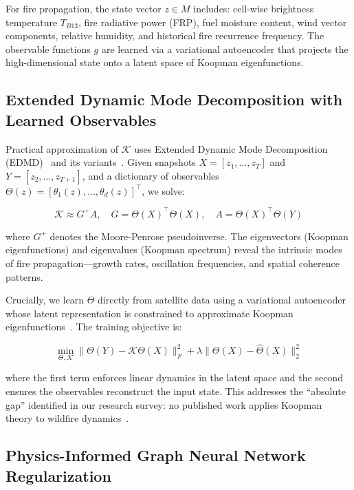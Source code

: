 \documentclass[5p,twocolumn]{elsarticle}
\newcommand{\abbrev}[1]{{\small\textsc{#1}}}
\newcommand{\sK}{\mathcal{K}}
\begin{document}
For fire propagation, the state vector $z \in M$ includes: cell-wise brightness temperature $T_{B13}$, fire radiative power (\abbrev{FRP}), fuel moisture content, wind vector components, relative humidity, and historical fire recurrence frequency. The observable functions $g$ are learned via a variational autoencoder that projects the high-dimensional state onto a latent space of Koopman eigenfunctions.

\subsection{Extended Dynamic Mode Decomposition with Learned Observables}

Practical approximation of $\sK$ uses Extended Dynamic Mode Decomposition (\abbrev{EDMD})~\cite{williams2015} and its variants~\cite{proctor2016,baddoo2023}. Given snapshots $X = [z_1, \ldots, z_T]$ and $Y = [z_2, \ldots, z_{T+1}]$, and a dictionary of observables $\Theta(z) = [\theta_1(z), \ldots, \theta_d(z)]^\top$, we solve:

\begin{equation}
\sK \approx G^{+} A, \quad G = \Theta(X)^\top \Theta(X), \quad A = \Theta(X)^\top \Theta(Y)
\label{eq:edmd}
\end{equation}

where $G^{+}$ denotes the Moore-Penrose pseudoinverse. The eigenvectors (Koopman eigenfunctions) and eigenvalues (Koopman spectrum) reveal the intrinsic modes of fire propagation---growth rates, oscillation frequencies, and spatial coherence patterns.

Crucially, we learn $\Theta$ directly from satellite data using a variational autoencoder whose latent representation is constrained to approximate Koopman eigenfunctions~\cite{lusch2018,takeishi2017}. The training objective is:

\begin{equation}
\min_{\Theta, \sK} \| \Theta(Y) - \sK \Theta(X) \|_F^2 + \lambda \| \Theta(X) - \hat{\Theta}(X) \|_2^2
\label{eq:vae_koopman}
\end{equation}

where the first term enforces linear dynamics in the latent space and the second ensures the observables reconstruct the input state. This addresses the ``absolute gap'' identified in our research survey: no published work applies Koopman theory to wildfire dynamics~\cite{brunton2022}.

\subsection{Physics-Informed Graph Neural Network Regularization}
\end{document}
